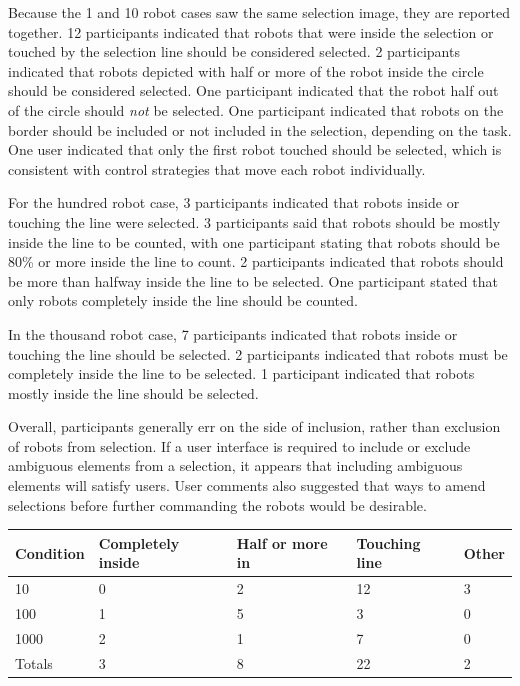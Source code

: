 Because the 1 and 10 robot cases saw the same selection image, they are reported together. 
12 participants indicated that robots that were inside the selection or touched by the selection line should be considered selected. 
2 participants indicated that robots depicted with half or more of the robot inside the circle should be considered selected. 
One participant indicated that the robot half out of the circle should \emph{not} be selected. 
One participant indicated that robots on the border should be included or not included in the selection, depending on the task. 
One user indicated that only the first robot touched should be selected, which is consistent with control strategies that move each robot individually. 

For the hundred robot case, 3 participants indicated that robots inside or touching the line were selected. 
3 participants said that robots should be mostly inside the line to be counted, with one participant stating that robots should be 80\% or more inside the line to count. 
2 participants indicated that robots should be more than halfway inside the line to be selected. 
One participant stated that only robots completely inside the line should be counted. 
 
In the thousand robot case, 7 participants indicated that robots inside or touching the line should be selected. 
2 participants indicated that robots must be completely inside the line to be selected. 
1 participant indicated that robots mostly inside the line should be selected. 

Overall, participants generally err on the side of inclusion, rather than exclusion of robots from selection.
If a user interface is required to include or exclude ambiguous elements from a selection, it appears that including ambiguous elements will satisfy users. 
User comments also suggested that ways to amend selections before further commanding the robots would be desirable.

 \begin{tabular}{ l l l l l}
   Condition & Completely inside & Half or more in & Touching line & Other\\
   \hline
   10 & 0 & 2 & 12 & 3 \\
   
   100 & 1 & 5 & 3 & 0 \\
   1000 & 2 & 1 & 7 & 0\\
   \hline
   Totals & 3 & 8 & 22 & 2 \\
 \end{tabular}

